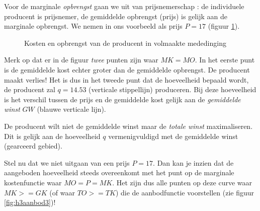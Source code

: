 Voor de marginale \textit{opbrengst} gaan we uit van prijsnemerschap : de individuele producent is prijsnemer, de gemiddelde opbrengst (prijs) is gelijk aan de marginale opbrengst. We nemen in ons voorbeeld als prijs $P=17$ (figuur \ref{fig:h3aanbod2}).

\begin{figure}[H]
\vspace{0.5cm}
\centering
\captionsetup{justification=centering,margin=2cm}
\caption{Kosten en opbrengst van de producent in volmaakte mededinging}
\label{fig:h3aanbod2}
\end{figure}

Merk op dat er in de figuur \textit{twee} punten zijn waar $MK=MO$. In het eerste punt is de gemiddelde kost echter groter dan de gemiddelde opbrengst. De producent maakt verlies! Het is dus in het tweede punt dat de hoeveelheid bepaald wordt, de producent zal $q=14.53$ (verticale stippellijn) produceren. Bij deze hoeveelheid is het verschil tussen de prijs en de gemiddelde kost gelijk aan de \textit{gemiddelde winst} $GW$ (blauwe verticale lijn).
\par De producent wilt niet de gemiddelde winst maar de \textit{totale winst} maximaliseren. Dit is gelijk aan de hoeveelheid $q$ vermenigvuldigd met de gemiddelde winst (gearceerd gebied).\\

\par Stel nu dat we niet uitgaan van een prijs $P=17$. Dan kan je inzien dat de aangeboden hoeveelheid steeds overeenkomt met het punt op de marginale kostenfunctie waar $MO=P=MK$. Het zijn dus alle punten op deze curve waar $MK>=GK$ (of waar $TO>=TK$) die de aanbodfunctie voorstellen (zie figuur \ref{fig:h3aanbod3})!

